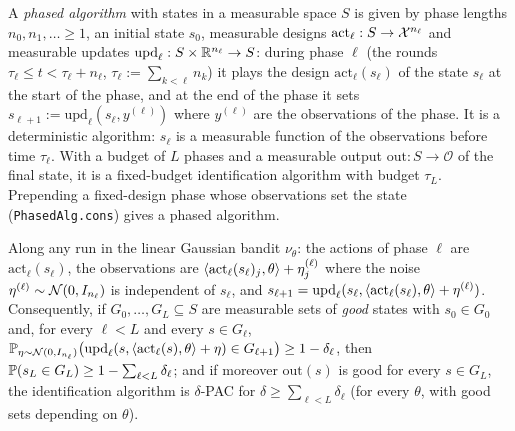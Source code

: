 \begin{lemma}\label{lem:phased}
\leanok
{}
A \emph{phased algorithm} with states in a measurable space $S$ is given by phase lengths
$n_0, n_1, \dots \ge 1$, an initial state $s_0$, measurable designs
$\mathrm{act}_\ell : S \to \mathcal{X}^{n_\ell}$ and measurable updates
$\mathrm{upd}_\ell : S \times \mathbb{R}^{n_\ell} \to S$: during phase $\ell$ (the rounds
$\tau_\ell \le t < \tau_\ell + n_\ell$, $\tau_\ell := \sum_{k<\ell} n_k$) it plays the design
$\mathrm{act}_\ell(s_\ell)$ of the state $s_\ell$ at the start of the phase, and at the end of
the phase it sets $s_{\ell+1} := \mathrm{upd}_\ell(s_\ell, y^{(\ell)})$ where $y^{(\ell)}$ are
the observations of the phase. It is a deterministic algorithm: $s_\ell$ is a measurable
function of the observations before time $\tau_\ell$. With a budget of $L$ phases and a
measurable output $\mathrm{out} : S \to \mathcal O$ of the final state, it is a fixed-budget
identification algorithm with budget $\tau_L$. Prepending a fixed-design phase whose
observations set the state (\texttt{PhasedAlg.cons}) gives a phased algorithm.

Along any run in the linear Gaussian bandit $\nu_\theta$: the actions of phase $\ell$ are
$\mathrm{act}_\ell(s_\ell)$, the observations are $\langle \mathrm{act}_\ell(s_\ell)_j, \theta \rangle + \eta^{(\ell)}_j$
where the noise $\eta^{(\ell)} \sim \mathcal{N}(0, I_{n_\ell})$ is independent of $s_\ell$, and
$s_{\ell+1} = \mathrm{upd}_\ell(s_\ell, \langle \mathrm{act}_\ell(s_\ell), \theta \rangle + \eta^{(\ell)})$.
Consequently, if $G_0, \dots, G_L \subseteq S$ are measurable sets of \emph{good} states with
$s_0 \in G_0$ and, for every $\ell < L$ and every $s \in G_\ell$,
$\mathbb{P}_{\eta \sim \mathcal{N}(0,I_{n_\ell})}\big(\mathrm{upd}_\ell(s, \langle \mathrm{act}_\ell(s), \theta \rangle + \eta) \in G_{\ell+1}\big) \ge 1 - \delta_\ell$,
then $\mathbb{P}(s_L \in G_L) \ge 1 - \sum_{\ell<L}\delta_\ell$; and if moreover $\mathrm{out}(s)$ is
good for every $s \in G_L$, the identification algorithm is $\delta$-PAC for
$\delta \ge \sum_{\ell<L}\delta_\ell$ (for every $\theta$, with good sets depending on $\theta$).
\end{lemma}

